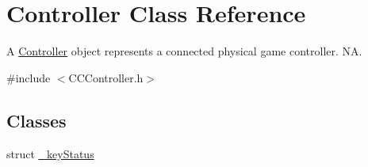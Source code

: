\hypertarget{classController}{}\section{Controller Class Reference}
\label{classController}


A \hyperlink{classController}{Controller} object represents a connected physical game controller.  NA.  




{\ttfamily \#include $<$C\+C\+Controller.\+h$>$}

\subsection*{Classes}
\begin{DoxyCompactItemize}
\item 
struct \hyperlink{structController_1_1__keyStatus}{\+\_\+key\+Status}
\end{DoxyCompactItemize}
